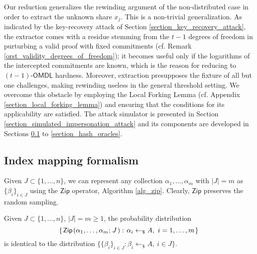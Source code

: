 \documentclass{iacrtrans}
\begin{document}
Our reduction generalizes the rewinding argument
of the non-distributed case
in order to extract the unknown share $x_j$.
This is a non-trivial generalization.
As indicated by the key-recovery attack
of Section \ref{section_key_recovery_attack},
the extractor comes with a residue
stemming from the $t-1$ degrees of freedom in purturbing a valid proof
with fixed commitments
(cf. Remark \ref{orst_validity_degrees_of_freedom});
it becomes useful only if the logarithms
of the intercepted commitments
are known,
which is the reason for reducing to
$(t-1)$-$\textsf{OMDL}$ hardness.
Moreover, extraction presupposes the fixture of
all but one challenges,
making rewinding useless
in the general threshold setting. We overcome this obstacle
by employing the Local Forking Lemma
(cf. Appendix \ref{section_local_forking_lemma})
and ensuring that the conditions for its applicability
are satisfied. The attack simulator is presented
in Section \ref{section_simulated_impersonation_attack}
and its components are developed in Sections
\ref{section_index_mapping} to
\ref{section_hash_oracles}.


\subsection{Index mapping formalism}\label{section_index_mapping}

Given $J \subset \{1, \dots, n\}$,
we can represent any collection
$\alpha_1, \dots, \alpha_m$ with $|J|=m$
as $\{\beta_i\}_{i \in J}$ using the
$\mathsf{Zip}$ operator, Algorithm \ref{alg_zip}.
Clearly, $\mathsf{Zip}$ preserves the random sampling.

\begin{lemma}\label{zip_lemma}
Given $J \subset \{1, \dots, n\}$, $|J| = m \ge 1$,
the probability distribution
\vspace{5pt}
\begin{equation*}
\{\hspace{1pt}
\mathsf{Zip}\hspace{1pt}(
\alpha_1, \dots, \alpha_m;\hspace{1pt} J\hspace{1pt}):
\hspace{1pt}\alpha_i \leftarrow_\$ A,
\ i = 1, \dots, m
\hspace{1pt}\}
\vspace{5pt}
\end{equation*}
is identical to the distribution
$\{\{\beta_i\}_{i \in J}: \beta_i \leftarrow_\$ A,\ i \in J\}$.
\end{lemma}
\end{document}
